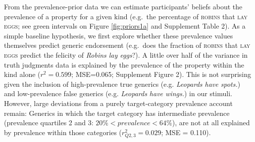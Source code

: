 \documentclass{pnastwo}
\begin{document}
\begin{article}




From the prevalence-prior data we can estimate participants' beliefs about the prevalence of a property for a given kind (e.g.~the percentage of \textsc{robins} that \textsc{lay eggs}; see green intervals on Figure \ref{fig:priors1a} and  Supplement Table 2).
As a simple baseline hypothesis, we first explore whether these prevalence values themselves predict generic endorsement (e.g.~does the fraction of \textsc{robins} that \textsc{lay eggs} predict the felicity of \emph{Robins lay eggs}?).
A little over half of the variance in truth judgments data is explained by the prevalence of the property within the kind alone ($r^2 = 0.599$; MSE=0.065; Supplement Figure 2). 
This is not surprising given the inclusion of high-prevalence true generics (e.g. \emph{Leopards have spots.}) and low-prevalence false generics (e.g. \emph{Leopards have wings.}) in our stimuli. 
However, large deviations from a purely target-category prevalence account remain: Generics in which the target category has intermediate prevalence (prevalence quartiles 2 and 3: $ 20\% < prevalence < 64\%$), are not at all explained by prevalence within those categories ($r_{Q2,3}^2 = 0.029$; MSE = 0.110).




\end{article}
\end{document}
